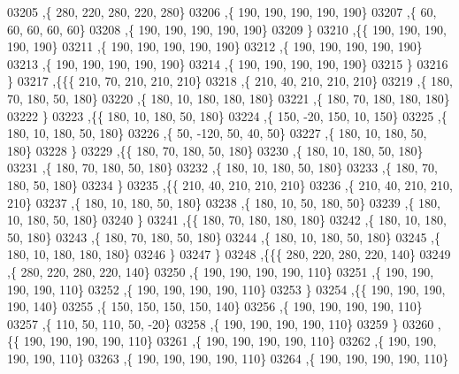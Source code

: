 \begin{DoxyCode}
03205     ,\{   280,   220,   280,   220,   280\}
03206     ,\{   190,   190,   190,   190,   190\}
03207     ,\{    60,    60,    60,    60,    60\}
03208     ,\{   190,   190,   190,   190,   190\}
03209     \}
03210    ,\{\{   190,   190,   190,   190,   190\}
03211     ,\{   190,   190,   190,   190,   190\}
03212     ,\{   190,   190,   190,   190,   190\}
03213     ,\{   190,   190,   190,   190,   190\}
03214     ,\{   190,   190,   190,   190,   190\}
03215     \}
03216    \}
03217   ,\{\{\{   210,    70,   210,   210,   210\}
03218     ,\{   210,    40,   210,   210,   210\}
03219     ,\{   180,    70,   180,    50,   180\}
03220     ,\{   180,    10,   180,   180,   180\}
03221     ,\{   180,    70,   180,   180,   180\}
03222     \}
03223    ,\{\{   180,    10,   180,    50,   180\}
03224     ,\{   150,   -20,   150,    10,   150\}
03225     ,\{   180,    10,   180,    50,   180\}
03226     ,\{    50,  -120,    50,    40,    50\}
03227     ,\{   180,    10,   180,    50,   180\}
03228     \}
03229    ,\{\{   180,    70,   180,    50,   180\}
03230     ,\{   180,    10,   180,    50,   180\}
03231     ,\{   180,    70,   180,    50,   180\}
03232     ,\{   180,    10,   180,    50,   180\}
03233     ,\{   180,    70,   180,    50,   180\}
03234     \}
03235    ,\{\{   210,    40,   210,   210,   210\}
03236     ,\{   210,    40,   210,   210,   210\}
03237     ,\{   180,    10,   180,    50,   180\}
03238     ,\{   180,    10,    50,   180,    50\}
03239     ,\{   180,    10,   180,    50,   180\}
03240     \}
03241    ,\{\{   180,    70,   180,   180,   180\}
03242     ,\{   180,    10,   180,    50,   180\}
03243     ,\{   180,    70,   180,    50,   180\}
03244     ,\{   180,    10,   180,    50,   180\}
03245     ,\{   180,    10,   180,   180,   180\}
03246     \}
03247    \}
03248   ,\{\{\{   280,   220,   280,   220,   140\}
03249     ,\{   280,   220,   280,   220,   140\}
03250     ,\{   190,   190,   190,   190,   110\}
03251     ,\{   190,   190,   190,   190,   110\}
03252     ,\{   190,   190,   190,   190,   110\}
03253     \}
03254    ,\{\{   190,   190,   190,   190,   140\}
03255     ,\{   150,   150,   150,   150,   140\}
03256     ,\{   190,   190,   190,   190,   110\}
03257     ,\{   110,    50,   110,    50,   -20\}
03258     ,\{   190,   190,   190,   190,   110\}
03259     \}
03260    ,\{\{   190,   190,   190,   190,   110\}
03261     ,\{   190,   190,   190,   190,   110\}
03262     ,\{   190,   190,   190,   190,   110\}
03263     ,\{   190,   190,   190,   190,   110\}
03264     ,\{   190,   190,   190,   190,   110\}

\end{DoxyCode}
